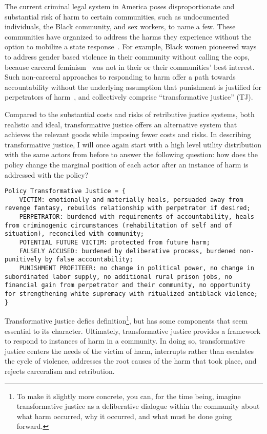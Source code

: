 \documentclass{article}
\begin{document}
        The current criminal legal system in America poses disproportionate and substantial risk of harm to certain communities, such as undocumented individuals, the Black community, and sex workers, to name a few. These communities have organized to address the harms they experience without the option to mobilize a state response~\cite{tj-brief-description}. For example, Black women pioneered ways to address gender based violence in their community without calling the cops, because carceral feminism~\cite{carceral-feminism} was not in their or their communities' best interest. Such non-carceral approaches to responding to harm offer a path towards accountability without the underlying assumption that punishment is justified for perpetrators of harm~\cite[p.203]{beyond-survival}, and collectively comprise ``transformative justice'' (TJ). 

        Compared to the substantial costs and risks of retributive justice systems, both realistic and ideal, transformative justice offers an alternative system that achieves the relevant goods while imposing fewer costs and risks. In describing transformative justice, I will once again start with a high level utility distribution with the same actors from before to answer the following question: how does the policy change the marginal position of each actor after an instance of harm is addressed with the policy?

\begin{lstlisting}[breaklines]
Policy Transformative Justice = {
    VICTIM: emotionally and materially heals, persuaded away from revenge fantasy, rebuilds relationship with perpetrator if desired; 
    PERPETRATOR: burdened with requirements of accountability, heals from criminogenic circumstances (rehabilitation of self and of situation), reconciled with community; 
    POTENTIAL FUTURE VICTIM: protected from future harm;
    FALSELY ACCUSED: burdened by deliberative process, burdened non-punitively by false accountability; 
    PUNISHMENT PROFITEER: no change in political power, no change in subordinated labor supply, no additional rural prison jobs, no financial gain from perpetrator and their community, no opportunity for strengthening white supremacy with ritualized antiblack violence;
}
\end{lstlisting}

        Transformative justice defies definition\footnote{To make it slightly more concrete, you can, for the time being, imagine transformative justice as a deliberative dialogue within the community about what harm occurred, why it occurred, and what must be done going forward.}, but has some components that seem essential to its character. Ultimately, transformative justice provides a framework to respond to instances of harm in a community. In doing so, transformative justice centers the needs of the victim of harm, interrupts rather than escalates the cycle of violence, addresses the root causes of the harm that took place, and rejects carceralism and retribution. 
\end{document}
